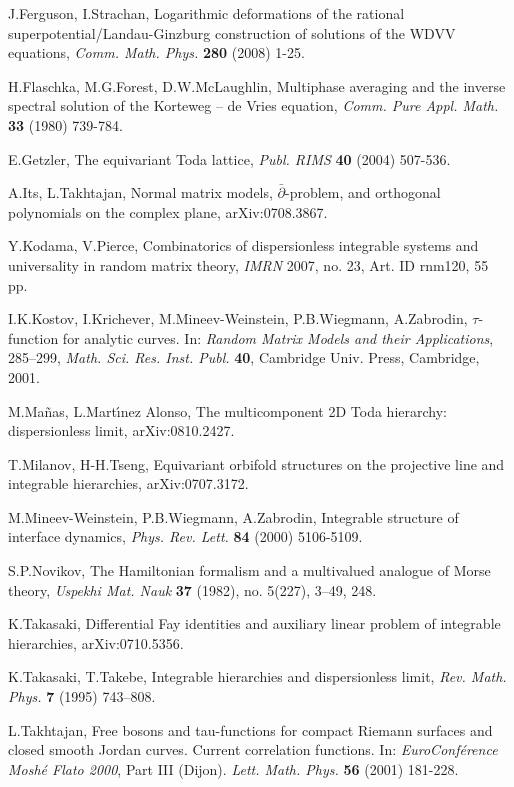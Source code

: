 \documentclass[numbook, envcountsame, envcountreset]{svjour3}
\begin{document}
\begin{thebibliography}{99}
 J.Ferguson, I.Strachan, Logarithmic deformations of the rational superpotential/Landau-Ginzburg construction of solutions of the WDVV equations, 
{\it Comm. Math. Phys.} {\bf 280} (2008) 1-25.

 H.Flaschka, M.G.Forest, D.W.McLaughlin,  Multiphase averaging and the inverse spectral solution of the Korteweg -- de Vries equation, {\it
Comm. Pure Appl. Math.} {\bf 33} (1980) 739-784.

 E.Getzler, The equivariant Toda lattice, {\it Publ. RIMS} {\bf 40} (2004) 507-536.

 A.Its, L.Takhtajan, Normal matrix models, $\bar{\partial}$-problem, and orthogonal polynomials on the complex plane, arXiv:0708.3867.

 Y.Kodama, V.Pierce, Combinatorics of dispersionless integrable systems and universality in random matrix theory, {\it IMRN} 2007, no. 23, Art. ID rnm120, 55 pp.

 I.K.Kostov, I.Krichever, M.Mineev-Weinstein, P.B.Wiegmann, A.Zabrodin, $\tau$-function for analytic curves. In: {\it Random Matrix Models and their Applications}, 285--299, 
{\it Math. Sci. Res. Inst. Publ.} {\bf 40}, Cambridge Univ. Press, Cambridge, 2001.

 M.Ma\~{n}as, L.Mart\'{\i}nez Alonso, The multicomponent 2D Toda hierarchy: dispersionless limit, arXiv:0810.2427.

 T.Milanov, H-H.Tseng, Equivariant orbifold structures on the projective line and integrable hierarchies, arXiv:0707.3172.

 M.Mineev-Weinstein, P.B.Wiegmann, A.Zabrodin, Integrable structure of interface dynamics, {\it Phys. Rev. Lett.} {\bf 84} (2000) 5106-5109.

 S.P.Novikov, The Hamiltonian formalism and a multivalued analogue of Morse theory, {\it Uspekhi Mat. Nauk} {\bf 37} (1982), no. 5(227), 3--49, 248.

 K.Takasaki, Differential Fay identities and auxiliary linear problem of integrable hierarchies, arXiv:0710.5356.

K.Takasaki, T.Takebe, Integrable hierarchies and dispersionless limit, {\it Rev. Math. Phys.}  {\bf 7}  (1995) 743--808.

 L.Takhtajan, Free bosons and tau-functions for compact Riemann surfaces and closed smooth Jordan
curves. Current correlation functions. In:
{\it EuroConf\'erence Mosh\'e Flato 2000}, Part III (Dijon).
{\it Lett. Math. Phys.} {\bf 56} (2001) 181-228.


\end{thebibliography}
\end{document}
